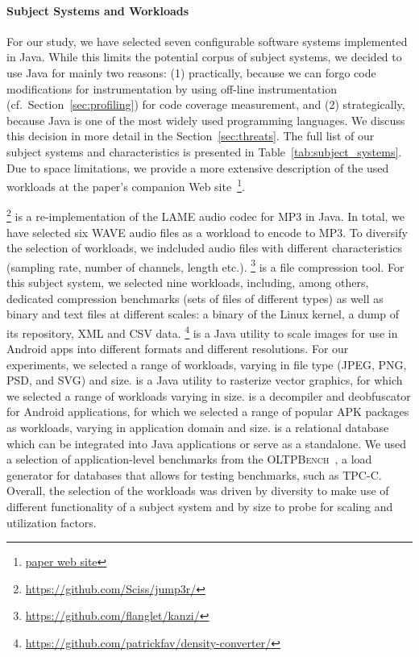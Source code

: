 \paragraph*{Subject Systems and Workloads}
For our study, we have selected seven configurable software systems implemented in Java. While this limits the potential corpus of subject systems, we decided to use Java for mainly two reasons: (1) practically, because we can forgo code modifications for instrumentation by using off-line instrumentation (cf.~Section~\ref{sec:profiling}) for code coverage measurement, and (2) strategically, because Java is one of the most widely used programming languages. We discuss this decision in more detail in the Section~\ref{sec:threats}. 
The full list of our subject systems and characteristics is presented in Table~\ref{tab:subject_systems}. Due to space limitations, we provide a more extensive description of the used workloads at the paper's companion Web site~\footnote{\url{paper web site}}.
	
\jumper\footnote{\url{https://github.com/Sciss/jump3r/}} is a re-implementation of the LAME audio codec for MP3 in Java. In total, we have selected six WAVE audio files as a workload to encode to MP3. To diversify the selection of workloads, we indcluded audio files with different characteristics (sampling rate, number of channels, length etc.). 
\kanzi\footnote{\url{https://github.com/flanglet/kanzi/}} is a file compression tool. For this subject system, we selected nine workloads, including, among others, dedicated compression benchmarks (sets of files of different types) as well as binary and text files at different scales: a binary of the Linux kernel, a dump of its repository, XML and CSV data. 
\dconvert\footnote{\url{https://github.com/patrickfav/density-converter/}} is a Java utility to scale images for use in Android apps into different formats and different resolutions. For our experiments, we selected a range of workloads, varying in file type (JPEG, PNG, PSD, and SVG) and size.
\batik is a Java utility to rasterize vector graphics, for which we selected a range of workloads varying in size.
\jadx is a decompiler and deobfuscator for Android applications, for which we selected a range of popular APK packages as workloads, varying in application domain and size.
\htwo is a relational database which can be integrated into Java applications or serve as a standalone. We used a selection of application-level benchmarks from the \textsc{OLTPBench}~\cite{difallah_oltp_2013}, a load generator for databases that allows for testing benchmarks, such as \textsc{TPC-C}. Overall, the selection of the workloads was driven by diversity to make use of different functionality of a subject system and by size to probe for scaling and utilization factors.
	
